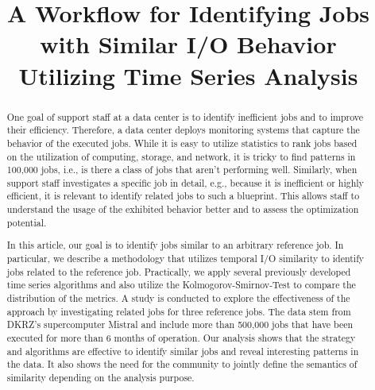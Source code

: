 \documentclass{jhps}
\begin{document}


\title{A Workflow for Identifying Jobs with Similar I/O Behavior Utilizing Time Series Analysis}


\maketitle


\begin{abstract}

One goal of support staff at a data center is to identify inefficient jobs and to improve their efficiency.
Therefore, a data center deploys monitoring systems that capture the behavior of the executed jobs.
While it is easy to utilize statistics to rank jobs based on the utilization of computing, storage, and network, it is tricky to find patterns in 100,000 jobs, i.e., is there a class of jobs that aren't performing well.
Similarly, when support staff investigates a specific job in detail, e.g., because it is inefficient or highly efficient, it is relevant to identify related jobs to such a blueprint.
This allows staff to understand the usage of the exhibited behavior better and to assess the optimization potential.

\medskip

In this article, our goal is to identify jobs similar to an arbitrary reference job. In particular, we describe a methodology that utilizes temporal I/O similarity to identify jobs related to the reference job.
Practically, we apply several previously developed time series algorithms and also utilize the Kolmogorov-Smirnov-Test to compare the distribution of the metrics.
A study is conducted to explore the effectiveness of the approach by investigating  related jobs for three reference jobs.
The data stem from DKRZ's supercomputer Mistral and include more than 500,000 jobs that have been executed for more than 6 months of operation. Our analysis shows that the strategy and algorithms are effective to identify similar jobs and reveal interesting patterns in the data.
It also shows the need for the community to jointly define the semantics of similarity depending on the analysis purpose.
\end{abstract}
\end{document}
